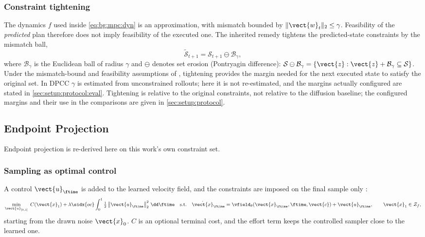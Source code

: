 \subsubsection*{Constraint tightening}

The dynamics $f$ used inside \eqref{eq:bg:mpc:dyn} is an approximation, with mismatch bounded
by $\|\vect{w}_{t}\|_{2}\le\gamma$. Feasibility of the \emph{predicted} plan therefore does not
imply feasibility of the executed one. The inherited remedy tightens the predicted-state
constraints by the mismatch ball,
\begin{equation}\label{eq:method:dpcc:tighten}
  \tilde{\mathcal{S}}_{t+1} = \mathcal{S}_{t+1}\ominus\mathcal{B}_{\gamma},
\end{equation}
where $\mathcal{B}_{\gamma}$ is the Euclidean ball of radius $\gamma$ and $\ominus$ denotes
set erosion (Pontryagin difference):
$\mathcal{S}\ominus\mathcal{B}_{\gamma}
=\{\vect{z}:\vect{z}+\mathcal{B}_{\gamma}\subseteq\mathcal{S}\}$.
Under the mismatch-bound and feasibility assumptions of
\parencite[Theorem~2]{romer2025diffusion}, tightening provides the margin needed for the next
executed state to satisfy the original set. In \ac{DPCC} $\gamma$ is estimated from unconstrained rollouts; here it is not re-estimated, and the margins
actually configured are stated in \autoref{sec:setup:protocol:eval}.
Tightening is relative to the original constraints, not relative to the diffusion baseline; the
configured margins and their use in the comparisons are given in \autoref{sec:setup:protocol}.

\subsection{Endpoint Projection}\label{sec:method:hardflow}

Endpoint projection \parencite{li2025hardflow} is re-derived here on this work's own constraint set.

\subsubsection*{Sampling as optimal control}

A control $\vect{u}_{\ftime}$ is added to the learned velocity field, and the constraints are imposed on
the final sample only \parencite[Problem~1]{li2025hardflow}:
\begin{equation}\label{eq:method:hf:oc}
  \min_{\vect{u}_{[0,1]}}\; C(\vect{x}_{1})
    + \lambda\sidx{oc}\int_{0}^{1}\tfrac{1}{2}\left\|\vect{u}_{\ftime}\right\|_{2}^{2}\,\dd\ftime
  \quad\text{s.t.}\quad
  \dot{\vect{x}}_{\ftime} = \vfield_{\theta}(\vect{x}_{\ftime},\ftime,\vect{c}) + \vect{u}_{\ftime},
  \qquad \vect{x}_{1}\in\mathcal{Z}_{f},
\end{equation}
starting from the drawn noise $\vect{x}_{0}$. $C$ is an optional terminal cost, and the effort term keeps
the controlled sampler close to the learned one.

